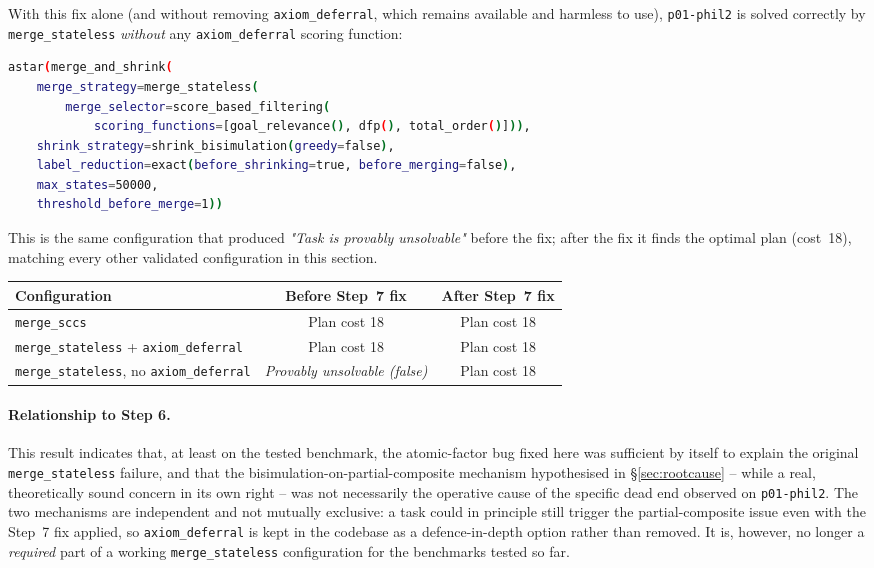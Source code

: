 \documentclass[11pt,a4paper]{article}
\begin{document}
With this fix alone (and without removing \texttt{axiom\_deferral}, which
remains available and harmless to use), \texttt{p01-phil2} is solved
correctly by \texttt{merge\_stateless} \emph{without} any
\texttt{axiom\_deferral} scoring function:
\begin{lstlisting}[language=bash, caption={merge\_stateless without axiom\_deferral, after the Step~7 fix}]
astar(merge_and_shrink(
    merge_strategy=merge_stateless(
        merge_selector=score_based_filtering(
            scoring_functions=[goal_relevance(), dfp(), total_order()])),
    shrink_strategy=shrink_bisimulation(greedy=false),
    label_reduction=exact(before_shrinking=true, before_merging=false),
    max_states=50000,
    threshold_before_merge=1))
\end{lstlisting}
This is the same configuration that produced \emph{"Task is provably
unsolvable"} before the fix; after the fix it finds the optimal plan
(cost~18), matching every other validated configuration in this section.

\begin{center}
\begin{tabular}{lcc}
\toprule
\textbf{Configuration} & \textbf{Before Step~7 fix} & \textbf{After Step~7 fix} \\
\midrule
\texttt{merge\_sccs} & Plan cost 18 & Plan cost 18 \\
\texttt{merge\_stateless} + \texttt{axiom\_deferral} & Plan cost 18 & Plan cost 18 \\
\texttt{merge\_stateless}, no \texttt{axiom\_deferral} & \emph{Provably unsolvable (false)} & Plan cost 18 \\
\bottomrule
\end{tabular}
\end{center}

\paragraph{Relationship to Step 6.} This result indicates that, at least on
the tested benchmark, the atomic-factor bug fixed here was sufficient by
itself to explain the original \texttt{merge\_stateless} failure, and that
the bisimulation-on-partial-composite mechanism hypothesised in
\S\ref{sec:rootcause} -- while a real, theoretically sound concern in its own
right -- was not necessarily the operative cause of the specific dead end
observed on \texttt{p01-phil2}. The two mechanisms are independent and not
mutually exclusive: a task could in principle still trigger the
partial-composite issue even with the Step~7 fix applied, so
\texttt{axiom\_deferral} is kept in the codebase as a defence-in-depth option
rather than removed. It is, however, no longer a \emph{required} part of a
working \texttt{merge\_stateless} configuration for the benchmarks tested so
far.
\end{document}
